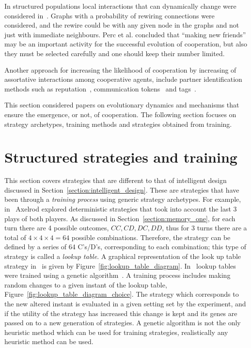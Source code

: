 In structured populations local interactions that can dynamically change were
considered in~\cite{Perc2011}. Graphs with a probability of rewiring 
connections were considered, and the rewire could be with any given node in the
graphs and not just with immediate neighbours. Perc et al. concluded that
``making new friends'' may be an important activity for the successful evolution
of cooperation, but also they must be selected carefully and one should keep
their number limited.

Another approach for increasing the likelihood of cooperation by increasing of
assortative interactions among cooperative agents, include partner identification
methods such as reputation~\cite{Janssen2006, Nowak1998, Suzuki2005},
communication tokens~\cite{Miller2002} and tags~\cite{Choi2006, Hales2000,
Miller2002, Riolo2001}.

This section considered papers on evolutionary dynamics and mechanisms that ensure
the emergence, or not, of cooperation. The following section focuses on strategy
archetypes, training methods and strategies obtained from training.

\section{Structured strategies and training}
\label{section:structured_strategies}

This section covers strategies that are different to that of intelligent design discussed
in Section~\ref{section:intelligent_design}. These are strategies that have
been through a \textit{training process} using generic strategy archetypes. For example,
in~\cite{Axelrod1987} Axelrod explored deterministic strategies that
took into account the last 3 plays of both players. As discussed in
Section~\ref{section:memory_one}, for each turn there are 4 possible outcomes,
\(CC, CD, DC, DD\), thus for 3 turns there are a total of
\(4\times4\times4=64\) possible combinations. Therefore, the strategy can be
defined by a series of 64 C's/D's, corresponding to each combination; this type
of strategy is called a \textit{lookup table}. A graphical representation of the
look up table strategy in~\cite{Axelrod1987} is given by Figure~\ref{fig:lookup_table_diagram}.
In~\cite{Axelrod1987} lookup tables were trained using a
genetic algorithm~\cite{Koza1997}. A training process includes making random changes to
a given instant of the lookup table, Figure~\ref{fig:lookup_table_diagram_choice}.
The strategy which corresponds to the new altered
instant is evaluated in a given setting set by the experiment, and if the
utility of the strategy has increased this change is kept and its genes are passed 
on to a new generation of strategies.
A genetic algorithm is not the only heuristic method which can be used for
training strategies, realistically any heuristic method can be used.


